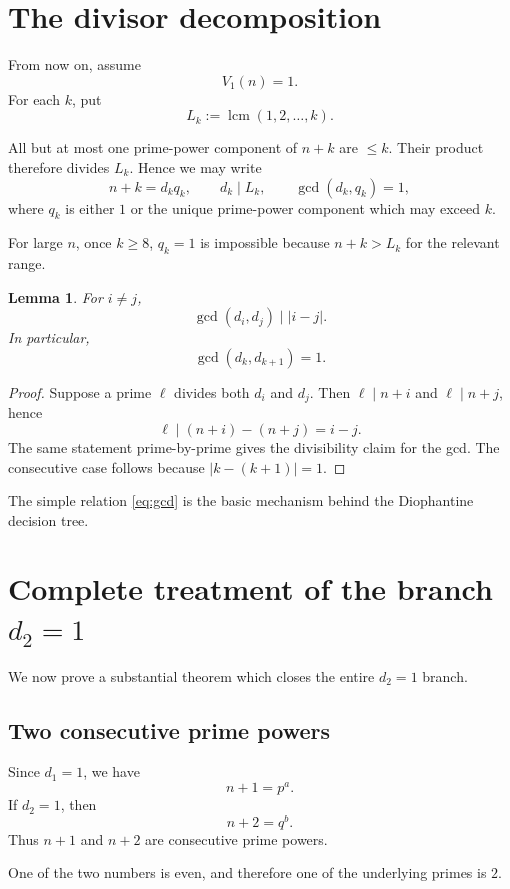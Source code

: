 \documentclass[11pt]{article}
\newtheorem{lemma}[theorem]{Lemma}
\begin{document}
\section{The divisor decomposition}

From now on, assume
\[
V_1(n)=1.
\]
For each \(k\), put
\[
L_k:=\operatorname{lcm}(1,2,\ldots,k).
\]

All but at most one prime-power component of \(n+k\) are \(\leq k\).  Their
product therefore divides \(L_k\).  Hence we may write
\[
\boxed{
n+k=d_kq_k,
\qquad
d_k\mid L_k,
\qquad
\gcd(d_k,q_k)=1,
}
\tag{5}
\]
where \(q_k\) is either \(1\) or the unique prime-power component which may
exceed \(k\).

For large \(n\), once \(k\geq8\), \(q_k=1\) is impossible because
\(n+k>L_k\) for the relevant range.

\begin{lemma}\label{lem:gcd}
For \(i\neq j\),
\[
\boxed{
\gcd(d_i,d_j)\mid |i-j|.
}
\tag{6}\label{eq:gcd}
\]
In particular,
\[
\boxed{
\gcd(d_k,d_{k+1})=1.
}
\tag{7}
\]
\end{lemma}

\begin{proof}
Suppose a prime \(\ell\) divides both \(d_i\) and \(d_j\).  Then
\(\ell\mid n+i\) and \(\ell\mid n+j\), hence
\[
\ell\mid (n+i)-(n+j)=i-j.
\]
The same statement prime-by-prime gives the divisibility claim for the gcd.
The consecutive case follows because \(|k-(k+1)|=1\).
\end{proof}

The simple relation \eqref{eq:gcd} is the basic mechanism behind the
Diophantine decision tree.

\section{Complete treatment of the branch \(d_2=1\)}

We now prove a substantial theorem which closes the entire \(d_2=1\)
branch.

\subsection{Two consecutive prime powers}

Since \(d_1=1\), we have
\[
n+1=p^a.
\]
If \(d_2=1\), then
\[
n+2=q^b.
\]
Thus \(n+1\) and \(n+2\) are consecutive prime powers.

One of the two numbers is even, and therefore one of the underlying primes
is \(2\).
\end{document}
